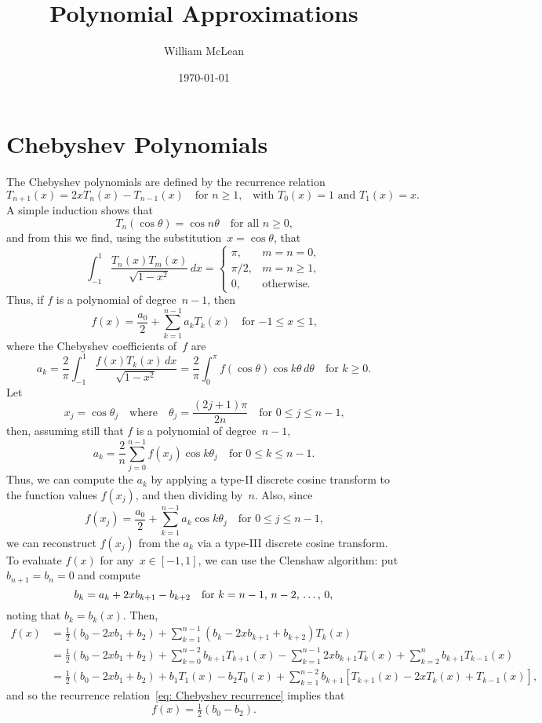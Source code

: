 \documentclass[12pt,a4paper]{article}
\title{Polynomial Approximations}
\author{William McLean}
\date{\today}
\begin{document}
\maketitle
\tableofcontents
\section{Chebyshev Polynomials}
The Chebyshev polynomials are defined by the recurrence relation
\begin{equation}\label{eq: Chebyshev recurrence}
T_{n+1}(x)=2xT_n(x)-T_{n-1}(x)\quad\text{for $n\ge1$,}
\quad\text{with $T_0(x)=1$ and $T_1(x)=x$.}
\end{equation}
A simple induction shows that
\begin{equation}\label{eq: Tn cos}
T_n(\cos\theta)=\cos n\theta\quad\text{for all $n\ge0$,}
\end{equation}
and from this we find, using the substitution~$x=\cos\theta$, that
\[
\int_{-1}^1\frac{T_n(x)T_m(x)}{\sqrt{1-x^2}}\,dx=\begin{cases}
\pi,&m=n=0,\\
\pi/2,&m=n\ge1,\\
0,&\text{otherwise.}\end{cases}
\]
Thus, if $f$ is a polynomial of degree~$n-1$, then
\[
f(x)=\frac{a_0}{2}+\sum_{k=1}^{n-1} a_kT_k(x)\quad\text{for $-1\le x\le 1$,}
\]
where the Chebyshev coefficients of~$f$ are
\[
a_k=\frac{2}{\pi}\int_{-1}^{1}\frac{f(x)T_k(x)\,dx}{\sqrt{1-x^2}}
    =\frac{2}{\pi}\int_0^\pi f(\cos\theta)\cos k\theta\,d\theta
\quad\text{for $k\ge0$.}
\]
Let 
\[
x_j=\cos\theta_j\quad\text{where}\quad\theta_j=\frac{(2j+1)\pi}{2n}
\quad\text{for $0\le j\le n-1$,}
\]
then, assuming still that $f$ is a polynomial of degree~$n-1$,
\[
a_k=\frac{2}{n}\sum_{j=0}^{n-1}f(x_j)\cos k\theta_j\quad
\text{for $0\le k\le n-1$.}
\]
Thus, we can compute the $a_k$ by applying a type-II discrete cosine transform 
to the function values $f(x_j)$, and then dividing by~$n$.  Also, since
\[
f(x_j)=\frac{a_0}{2}+\sum_{k=1}^{n-1}a_k\cos k\theta_j\quad
\text{for $0\le j\le n-1$,}
\]
we can reconstruct $f(x_j)$ from the $a_k$ via a type-III discrete cosine 
transform.  To evaluate $f(x)$ for any~$x\in[-1,1]$, we can use the Clenshaw 
algorithm: put $b_{n+1}=b_n=0$ and compute
\[
b_k=a_k+2xb_{k+1}-b_{k+2}\quad\text{for $k=n-1$, $n-2$, \dots, $0$,}
\]
noting that $b_k=b_k(x)$. Then,
\begin{align*}
f(x)&=\tfrac12(b_0-2xb_1+b_2)+\sum_{k=1}^{n-1}(b_k-2xb_{k+1}+b_{k+2})T_k(x)\\
    &=\tfrac12(b_0-2xb_1+b_2)+\sum_{k=0}^{n-2}b_{k+1}T_{k+1}(x)
    -\sum_{k=1}^{n-1}2xb_{k+1}T_k(x)+\sum_{k=2}^nb_{k+1}T_{k-1}(x)\\
    &=\tfrac12(b_0-2xb_1+b_2)+b_1T_1(x)-b_2T_0(x)+\sum_{k=1}^{n-2}b_{k+1}
    [T_{k+1}(x)-2xT_k(x)+T_{k-1}(x)],
\end{align*}
and so the recurrence relation~\eqref{eq: Chebyshev recurrence} implies that
\[
f(x)=\tfrac12(b_0-b_2).
\]
\end{document}
